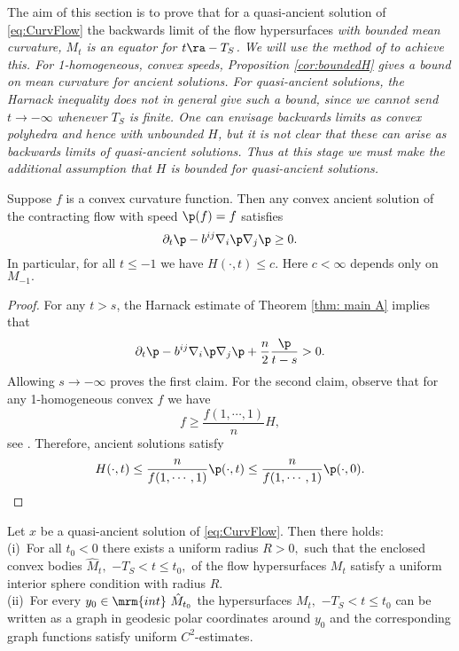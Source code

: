 \documentclass[12pt]{amsart}
\begin{document}
The aim of this section is to prove that for a quasi-ancient solution of \eqref{eq:CurvFlow} the backwards limit of the flow hypersurfaces \it{with bounded mean curvature}, $M_t$ is an equator for $t\ra -T_S$. We will use the method of \cite{MakowskiScheuer:/2013} to achieve this.
For 1-homogeneous, convex speeds, Proposition \ref{cor:boundedH} gives a bound on mean curvature for ancient solutions. For quasi-ancient solutions, the Harnack inequality does not in general give such a bound, since we cannot send \(t \to -\infty\) whenever \(T_S\) is finite. One can envisage backwards limits as convex polyhedra and hence with unbounded \(H\), but it is not clear that these can arise as backwards limits of quasi-ancient solutions. Thus at this stage we must make the additional assumption that \(H\) is bounded for quasi-ancient solutions.
\begin{proposition}
\label{cor:boundedH}
Suppose $f$ is a convex curvature function. Then any convex ancient solution of the contracting flow with speed $\p(f)=f$ satisfies
\[\partial_t \p-b^{ij}\nabla_i\p\nabla_j\p\geq 0.\]
In particular, for all $t\le -1$ we have
$H(\cdot,t)\leq c.$
Here $c<\infty$ depends only on $M_{-1}.$
\end{proposition}
\begin{proof}
For any $t>s$, the  Harnack estimate of Theorem \ref{thm: main A} implies that
$$\partial_t \p-b^{ij}\nabla_i\p\nabla_j\p+\frac{n}{2}\frac{\p}{t-s}>0.$$
Allowing $s\to-\infty$ proves the first claim. For the second claim, observe that for any 1-homogeneous convex $f$ we have \[f\ge \frac{f(1,\cdots,1)}{n}H,\]
see \cite[Chapter 2]{Gerhardt:/2006}. Therefore, ancient solutions satisfy
\[H(\cdot,t)\leq \frac{n}{f(1,\cdots,1)}\p(\cdot,t)\leq \frac{n}{f(1,\cdots,1)}\p(\cdot,0). \]
\end{proof}

\begin{lemma}\label{ISC}
Let $x$ be a quasi-ancient solution of \eqref{eq:CurvFlow}. Then there holds:\\

(i)~For all $t_0<0$ there exists a uniform radius $R>0,$ such that the enclosed convex bodies $\hat{M}_t,$ $-T_S<t\leq t_0,$ of the flow hypersurfaces $M_t$ satisfy a uniform interior sphere condition with radius $R.$\\

(ii)~For every $y_0\in\mrm{int}~\hat{M}_{t_0}$ the hypersurfaces $M_t,$ $-T_S<t\leq t_0$ can be written as a graph in geodesic polar coordinates around $y_0$ and the corresponding graph functions satisfy uniform $C^2$-estimates.
\end{lemma}
\end{document}
